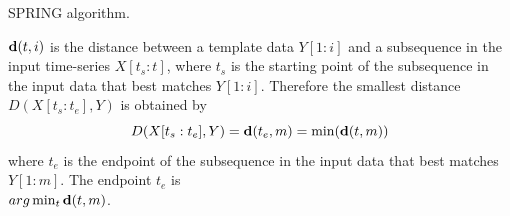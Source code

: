 \documentclass{sigchi-ext}
\begin{document}
        \begin{algorithm}[!t]
            \begin{algorithmic}[1]
                \EndFor
                \EndIf
                \EndFor
                \EndIf
                \EndIf
                \EndIf
                \EndFor
            \end{algorithmic}
            \caption{SPRING algorithm.}
            \label{fig:spring-original}
        \end{algorithm}
        
        ${\bf d}(t,i)$ is the distance between a template data $Y[1:i]$ and a subsequence in the input time-series $X[t_s:t]$, where $t_s$ is the starting point of the subsequence in the input data that best matches $Y[1:i]$. Therefore the smallest distance $D(X[t_s:t_e],Y)$ is obtained by 
        \begin{equation}
            D(X[t_s:t_e],Y)={\bf d}(t_e,m)=\min({\bf d}(t,m))
        \end{equation}
        where $t_e$ is the endpoint of the subsequence in the input data that best matches $Y[1:m]$. The endpoint $t_e$ is \\$arg\min_t{\bf d}(t,m)$.
        
\end{document}

